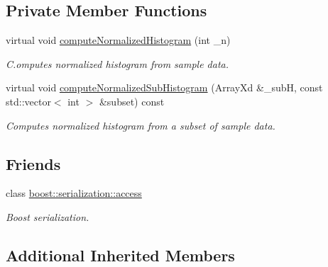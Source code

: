 \subsection*{Private Member Functions}
\begin{DoxyCompactItemize}
\item 
virtual void \hyperlink{class_c_discrete_sample_a3292af167095c8fc140dcb925e53fc58}{compute\-Normalized\-Histogram} (int \-\_\-n)
\begin{DoxyCompactList}\small\item\em C.\-omputes normalized histogram from sample data. \end{DoxyCompactList}\item 
virtual void \hyperlink{class_c_discrete_sample_a7056f6e7c8d98a88e272ef26dde01380}{compute\-Normalized\-Sub\-Histogram} (Array\-Xd \&\-\_\-sub\-H, const std\-::vector$<$ int $>$ \&subset) const 
\begin{DoxyCompactList}\small\item\em Computes normalized histogram from a subset of sample data. \end{DoxyCompactList}\end{DoxyCompactItemize}
\subsection*{Friends}
\begin{DoxyCompactItemize}
\item 
class \hyperlink{class_c_discrete_sample_ac98d07dd8f7b70e16ccb9a01abf56b9c}{boost\-::serialization\-::access}
\begin{DoxyCompactList}\small\item\em Boost serialization. \end{DoxyCompactList}\end{DoxyCompactItemize}
\subsection*{Additional Inherited Members}



